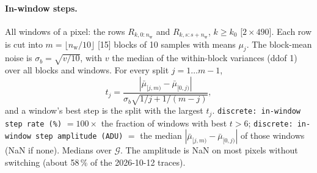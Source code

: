 \documentclass[10pt]{article}
\newcommand{\code}[1]{\texttt{#1}}
\newcommand{\nw}{n_\text{w}}
\newcommand{\ko}{k_0}
\newcommand{\G}{\mathcal G}
\begin{document}
\paragraph{In-window steps.} All windows of a pixel: the rows $R_{k,0:\nw}$ and $R_{k,s:s+\nw}$, $k \ge \ko$ [$2\times490$]. Each row
is cut into $m = \lfloor\nw/10\rfloor$ [15] blocks of 10 samples with means $\mu_j$. The block-mean noise is
$\sigma_b = \sqrt{v/10}$, with $v$ the median of the within-block variances (ddof 1) over all blocks and windows. For every split
$j = 1 \dots m-1$,
\begin{equation}
t_j = \frac{|\bar\mu_{[j,m)} - \bar\mu_{[0,j)}|}{\sigma_b\sqrt{1/j + 1/(m-j)}},
\end{equation}
and a window's best step is the split with the largest $t_j$. \code{discrete: in-window step rate (\%)} $= 100\times$ the fraction of
windows with best $t > 6$; \code{discrete: in-window step amplitude (ADU)} $=$ the median $|\bar\mu_{[j,m)} - \bar\mu_{[0,j)}|$ of those
windows (NaN if none). Medians over $\G$. The amplitude is NaN on most pixels without switching (about 58\,\% of the 2026-10-12 traces).
\end{document}

